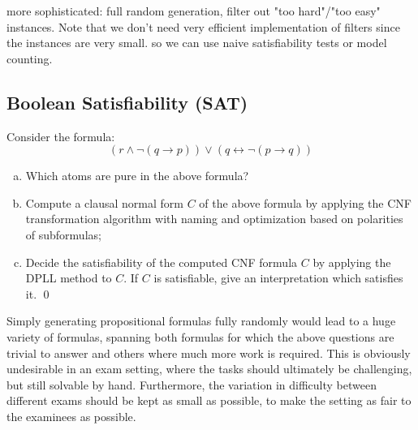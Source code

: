 more sophisticated: full random generation, filter out "too hard"/"too easy" instances.
Note that we don't need very efficient implementation of filters since the instances are very small.
so we can use naive satisfiability tests or model counting.

\subsection{Boolean Satisfiability (SAT)}

\begin{mdframed}
    \begin{example}[SAT]
        Consider the formula:
        \[
            ( r \land \lnot ( q \rightarrow p ) ) \lor ( q \leftrightarrow \lnot ( p \rightarrow q ) )
        \]
        \begin{enumerate}[(a)]
            \item
                Which atoms are pure in the above formula?
            \item\label{subtask:sat-cnf}
                Compute a clausal normal form $C$ of the above formula by
                applying the CNF transformation algorithm with naming and
                optimization based on polarities of subformulas;
            \item
                Decide the satisfiability of the computed CNF formula $C$
                by applying the DPLL method to $C$. If $C$ is
                satisfiable, give an interpretation which
                satisfies it.
                \qed
        \end{enumerate}
    \end{example}
\end{mdframed}


Simply generating propositional formulas fully randomly would lead
to a huge variety of formulas,
spanning both formulas for which the above questions are trivial to answer
and others where much more work is required.
This is obviously undesirable in an exam setting,
where the tasks should ultimately be challenging, but still solvable by hand.
Furthermore,
the variation in difficulty between different exams should be kept as small as possible,
to make the setting as fair to the examinees as possible.

